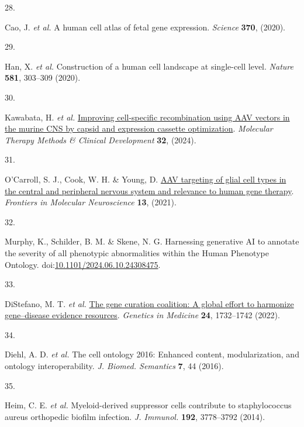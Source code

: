 \documentclass[
]{article}
\newlength{\cslhangindent}
\newlength{\csllabelwidth}
\newenvironment{CSLReferences}[2] %
 {\begin{list}{}{%
  \setlength{\itemindent}{0pt}
  \setlength{\leftmargin}{0pt}
  \setlength{\parsep}{0pt}
  \ifodd #1
   \setlength{\leftmargin}{\cslhangindent}
   \setlength{\itemindent}{-1\cslhangindent}
  \fi
  \setlength{\itemsep}{#2\baselineskip}}}
 {\end{list}}
\newcommand{\CSLLeftMargin}[1]{\parbox[t]{\csllabelwidth}{\strut#1\strut}}
\newcommand{\CSLRightInline}[1]{\parbox[t]{\linewidth - \csllabelwidth}{\strut#1\strut}}
\begin{document}
\begin{CSLReferences}{0}{0}
\CSLLeftMargin{28. }%
\CSLRightInline{Cao, J. \emph{et al.} A human cell atlas of fetal gene
expression. \emph{Science} \textbf{370}, (2020).}

\CSLLeftMargin{29. }%
\CSLRightInline{Han, X. \emph{et al.} Construction of a human cell
landscape at single-cell level. \emph{Nature} \textbf{581}, 303--309
(2020).}

\CSLLeftMargin{30. }%
\CSLRightInline{Kawabata, H. \emph{et al.}
\href{https://doi.org/10.1016/j.omtm.2024.101185}{Improving
cell-specific recombination using AAV vectors in the murine CNS by
capsid and expression cassette optimization}. \emph{Molecular Therapy
Methods \& Clinical Development} \textbf{32}, (2024).}

\CSLLeftMargin{31. }%
\CSLRightInline{O'Carroll, S. J., Cook, W. H. \& Young, D.
\href{https://doi.org/10.3389/fnmol.2020.618020}{AAV targeting of glial
cell types in the central and peripheral nervous system and relevance to
human gene therapy}. \emph{Frontiers in Molecular Neuroscience}
\textbf{13}, (2021).}

\CSLLeftMargin{32. }%
\CSLRightInline{Murphy, K., Schilder, B. M. \& Skene, N. G. Harnessing
generative AI to annotate the severity of all phenotypic abnormalities
within the Human Phenotype Ontology.
doi:\href{https://doi.org/10.1101/2024.06.10.24308475}{10.1101/2024.06.10.24308475}.}

\CSLLeftMargin{33. }%
\CSLRightInline{DiStefano, M. T. \emph{et al.}
\href{https://doi.org/10.1016/j.gim.2022.04.017}{The gene curation
coalition: A global effort to harmonize gene--disease evidence
resources}. \emph{Genetics in Medicine} \textbf{24}, 1732--1742 (2022).}

\CSLLeftMargin{34. }%
\CSLRightInline{Diehl, A. D. \emph{et al.} The cell ontology 2016:
Enhanced content, modularization, and ontology interoperability.
\emph{J. Biomed. Semantics} \textbf{7}, 44 (2016).}

\CSLLeftMargin{35. }%
\CSLRightInline{Heim, C. E. \emph{et al.} Myeloid-derived suppressor
cells contribute to staphylococcus aureus orthopedic biofilm infection.
\emph{J. Immunol.} \textbf{192}, 3778--3792 (2014).}


\end{CSLReferences}
\end{document}

